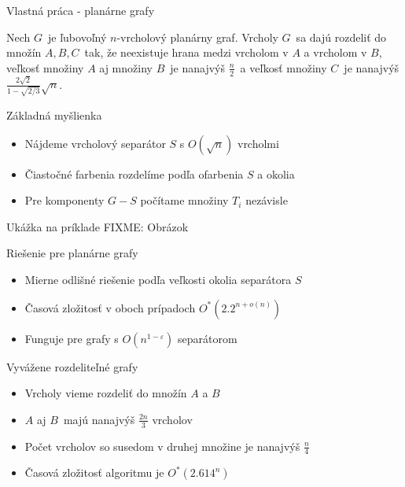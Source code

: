 \documentclass[slovak]{beamer}
\begin{document}
\begin{frame}{Vlastná práca - planárne grafy}
    \begin{theorem}
        Nech $G$ je ľubovoľný $n$-vrcholový planárny graf. Vrcholy $G$ sa dajú rozdeliť
        do množín $A, B, C$ tak, že neexistuje hrana medzi vrcholom v $A$ a vrcholom v $B$,
        veľkosť množiny $A$ aj množiny $B$ je nanajvýš $\frac{n}{2}$ a veľkosť množiny $C$ je nanajvýš
        $\frac{2\sqrt{2}}{1 - \sqrt{2/3}} \sqrt{n}$.
    \end{theorem}
\end{frame}

\begin{frame}{Základná myšlienka}
    \begin{itemize}
        \item Nájdeme vrcholový separátor $S$ s $O(\sqrt{n})$ vrcholmi
        \item Čiastočné farbenia rozdelíme podľa ofarbenia $S$ a okolia
        \item Pre komponenty $G - S$ počítame množiny $T_i$ nezávisle
    \end{itemize}
\end{frame}

\begin{frame}{Ukážka na príklade}
    FIXME: Obrázok
\end{frame}

\begin{frame}{Riešenie pre planárne grafy}
    \begin{itemize}
        \item Mierne odlišné riešenie podľa veľkosti okolia separátora $S$
        \item Časová zložitosť v oboch prípadoch $O^*(2.2^{n + o(n)})$
        \item Funguje pre grafy s $O(n^{1 - \varepsilon})$ separátorom
    \end{itemize}
\end{frame}

\begin{frame}{Vyvážene rozdeliteľné grafy}
    \begin{itemize}
        \item Vrcholy vieme rozdeliť do množín $A$ a $B$
        \item $A$ aj $B$ majú nanajvýš $\frac{2n}{3}$ vrcholov
        \item Počet vrcholov so susedom v druhej množine je nanajvýš $\frac{n}{4}$
        \item Časová zložitosť algoritmu je $O^*(2.614^n)$
    \end{itemize}

\end{frame}
\end{document}
